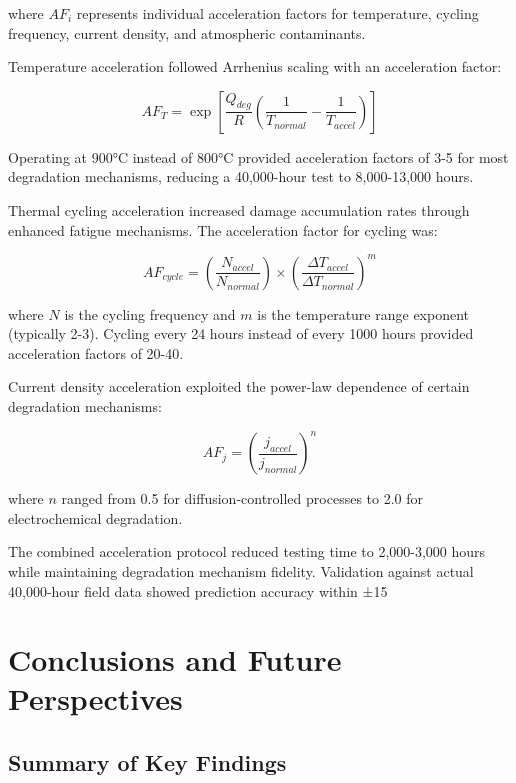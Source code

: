\documentclass[conference]{IEEEtran}
\begin{document}
where $AF_i$ represents individual acceleration factors for temperature, cycling frequency, current density, and atmospheric contaminants.

Temperature acceleration followed Arrhenius scaling with an acceleration factor:

\begin{equation}
AF_T = \exp\left[\frac{Q_{deg}}{R}\left(\frac{1}{T_{normal}} - \frac{1}{T_{accel}}\right)\right]
\end{equation}

Operating at 900°C instead of 800°C provided acceleration factors of 3-5 for most degradation mechanisms, reducing a 40,000-hour test to 8,000-13,000 hours.

Thermal cycling acceleration increased damage accumulation rates through enhanced fatigue mechanisms. The acceleration factor for cycling was:

\begin{equation}
AF_{cycle} = \left(\frac{N_{accel}}{N_{normal}}\right) \times \left(\frac{\Delta T_{accel}}{\Delta T_{normal}}\right)^m
\end{equation}

where $N$ is the cycling frequency and $m$ is the temperature range exponent (typically 2-3). Cycling every 24 hours instead of every 1000 hours provided acceleration factors of 20-40.

Current density acceleration exploited the power-law dependence of certain degradation mechanisms:

\begin{equation}
AF_j = \left(\frac{j_{accel}}{j_{normal}}\right)^n
\end{equation}

where $n$ ranged from 0.5 for diffusion-controlled processes to 2.0 for electrochemical degradation.

The combined acceleration protocol reduced testing time to 2,000-3,000 hours while maintaining degradation mechanism fidelity. Validation against actual 40,000-hour field data showed prediction accuracy within ±15%

\section{Conclusions and Future Perspectives}

\subsection{Summary of Key Findings}
\end{document}
